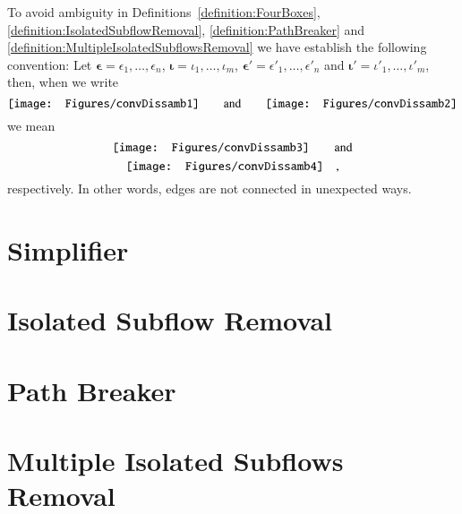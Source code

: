\begin{convention}
To avoid ambiguity in Definitions~\vref{definition:FourBoxes}, \vref{definition:IsolatedSubflowRemoval}, \vref{definition:PathBreaker} and \vref{definition:MultipleIsolatedSubflowsRemoval} we have establish the following convention:
Let $\boldsymbol\epsilon=\epsilon_1,\dots,\epsilon_n$, $\boldsymbol\iota=\iota_1,\dots,\iota_m$, $\boldsymbol{\epsilon'}=\epsilon'_1,\dots,\epsilon'_n$ and $\boldsymbol{\iota'}=\iota'_1,\dots,\iota'_m$, then, when we write
\[
\vcenter{\hbox{\texttt{[image: Figures/convDissamb1]}}}
\qquad\mbox{and}\qquad
\vcenter{\hbox{\texttt{[image: Figures/convDissamb2]}}}
\]
we mean
\[
\vcenter{\hbox{\texttt{[image: Figures/convDissamb3]}}}
\qquad\mbox{and}
\]
\[
\vcenter{\hbox{\texttt{[image: Figures/convDissamb4]}}}
\quad,
\]
respectively. In other words, edges are not connected in unexpected ways.
\end{convention}

\section{Simplifier}\label{section:Simplifier}



\section{Isolated Subflow Removal}\label{section:IsolatedSubflowRemoval}



\section{Path Breaker}\label{section:PathBreaker}



\section{Multiple Isolated Subflows Removal}\label{section:MultipleIsolatedSubflowsRemoval}


